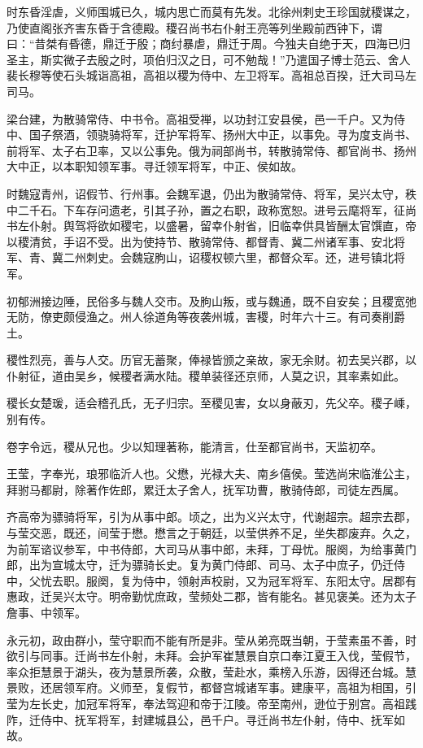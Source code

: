 \documentclass[12pt,UTF8]{ctexbook}
\begin{document}
时东昏淫虐，义师围城已久，城内思亡而莫有先发。北徐州刺史王珍国就稷谋之，乃使直阁张齐害东昏于含德殿。稷召尚书右仆射王亮等列坐殿前西钟下，谓曰：“昔桀有昏德，鼎迁于殷；商纣暴虐，鼎迁于周。今独夫自绝于天，四海已归圣主，斯实微子去殷之时，项伯归汉之日，可不勉哉！”乃遣国子博士范云、舍人裴长穆等使石头城诣高祖，高祖以稷为侍中、左卫将军。高祖总百揆，迁大司马左司马。

梁台建，为散骑常侍、中书令。高祖受禅，以功封江安县侯，邑一千户。又为侍中、国子祭酒，领骁骑将军，迁护军将军、扬州大中正，以事免。寻为度支尚书、前将军、太子右卫率，又以公事免。俄为祠部尚书，转散骑常侍、都官尚书、扬州大中正，以本职知领军事。寻迁领军将军，中正、侯如故。

时魏寇青州，诏假节、行州事。会魏军退，仍出为散骑常侍、将军，吴兴太守，秩中二千石。下车存问遗老，引其子孙，置之右职，政称宽恕。进号云麾将军，征尚书左仆射。舆驾将欲如稷宅，以盛暑，留幸仆射省，旧临幸供具皆酬太官馔直，帝以稷清贫，手诏不受。出为使持节、散骑常侍、都督青、冀二州诸军事、安北将军、青、冀二州刺史。会魏寇朐山，诏稷权顿六里，都督众军。还，进号镇北将军。

初郁洲接边陲，民俗多与魏人交市。及朐山叛，或与魏通，既不自安矣；且稷宽弛无防，僚吏颇侵渔之。州人徐道角等夜袭州城，害稷，时年六十三。有司奏削爵土。

稷性烈亮，善与人交。历官无蓄聚，俸禄皆颁之亲故，家无余财。初去吴兴郡，以仆射征，道由吴乡，候稷者满水陆。稷单装径还京师，人莫之识，其率素如此。

稷长女楚瑗，适会稽孔氏，无子归宗。至稷见害，女以身蔽刃，先父卒。稷子嵊，别有传。

卷字令远，稷从兄也。少以知理著称，能清言，仕至都官尚书，天监初卒。

王莹，字奉光，琅邪临沂人也。父懋，光禄大夫、南乡僖侯。莹选尚宋临淮公主，拜驸马都尉，除著作佐郎，累迁太子舍人，抚军功曹，散骑侍郎，司徒左西属。

齐高帝为骠骑将军，引为从事中郎。顷之，出为义兴太守，代谢超宗。超宗去郡，与莹交恶，既还，间莹于懋。懋言之于朝廷，以莹供养不足，坐失郡废弃。久之，为前军谘议参军，中书侍郎，大司马从事中郎，未拜，丁母忧。服阕，为给事黄门郎，出为宣城太守，迁为骠骑长史。复为黄门侍郎、司马、太子中庶子，仍迁侍中，父忧去职。服阕，复为侍中，领射声校尉，又为冠军将军、东阳太守。居郡有惠政，迁吴兴太守。明帝勤忧庶政，莹频处二郡，皆有能名。甚见褒美。还为太子詹事、中领军。

永元初，政由群小，莹守职而不能有所是非。莹从弟亮既当朝，于莹素虽不善，时欲引与同事。迁尚书左仆射，未拜。会护军崔慧景自京口奉江夏王入伐，莹假节，率众拒慧景于湖头，夜为慧景所袭，众散，莹赴水，乘榜入乐游，因得还台城。慧景败，还居领军府。义师至，复假节，都督宫城诸军事。建康平，高祖为相国，引莹为左长史，加冠军将军，奉法驾迎和帝于江陵。帝至南州，逊位于别宫。高祖践阼，迁侍中、抚军将军，封建城县公，邑千户。寻迁尚书左仆射，侍中、抚军如故。
\end{document}
